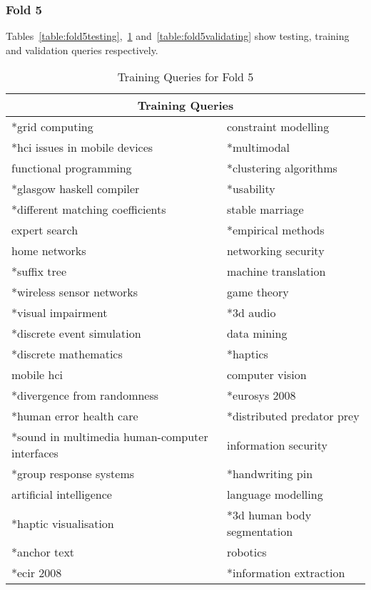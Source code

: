 \subsubsection{Fold 5}

Tables~\ref{table:fold5testing},~\ref{table:fold5training} and~\ref{table:fold5validating} show testing, training and validation queries respectively.

\begin{table}
\centering
\begin{tabular}{|l|l|}

\hline \multicolumn{2}{|c|}{\textbf{Training Queries}} \\
\hline *grid computing & constraint modelling \\
\hline *hci issues in mobile devices & *multimodal \\
\hline functional programming & *clustering algorithms \\
\hline *glasgow haskell compiler & *usability \\ 
\hline *different matching coefficients & stable marriage \\
\hline expert search & *empirical methods \\ 
\hline home networks & networking security \\
\hline *suffix tree & machine translation \\ 
\hline *wireless sensor networks & game theory \\
\hline *visual impairment & *3d audio \\ 
\hline *discrete event simulation & data mining \\
\hline *discrete mathematics & *haptics \\ 
\hline mobile hci & computer vision \\
\hline *divergence from randomness & *eurosys 2008 \\
\hline *human error health care & *distributed predator prey \\
\hline *sound in multimedia human-computer interfaces & information security \\
\hline *group response systems & *handwriting pin \\
\hline artificial intelligence & language modelling\\
\hline *haptic visualisation & *3d human body segmentation \\
\hline *anchor text & robotics \\
\hline *ecir 2008 & *information extraction \\
\hline
\end{tabular}
\caption{Training Queries for Fold 5} \label{table:fold5training}
\end{table}


